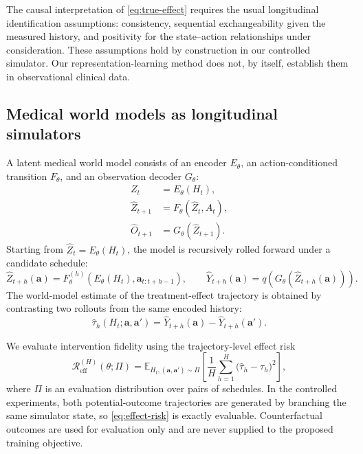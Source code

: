 The causal interpretation of \eqref{eq:true-effect} requires the usual
longitudinal identification assumptions: consistency, sequential
exchangeability given the measured history, and positivity for the
state--action relationships under consideration. These assumptions hold
by construction in our controlled simulator. Our representation-learning
method does not, by itself, establish them in observational clinical data.

\subsection{Medical world models as longitudinal simulators}

A latent medical world model consists of an encoder $E_\theta$, an
action-conditioned transition $F_\theta$, and an observation decoder
$G_\theta$:
\begin{align}
    Z_t &= E_\theta(H_t),
    \label{eq:encoder}\\
    \widehat Z_{t+1} &= F_\theta(\widehat Z_t,A_t),
    \label{eq:transition}\\
    \widehat O_{t+1} &= G_\theta(\widehat Z_{t+1}).
    \label{eq:decoder}
\end{align}
Starting from $\widehat Z_t=E_\theta(H_t)$, the model is recursively
rolled forward under a candidate schedule:
\begin{equation}
    \widehat Z_{t+h}(\bm a)
    =F_\theta^{(h)}
    \!\left(E_\theta(H_t),\bm a_{t:t+h-1}\right),
    \qquad
    \widehat Y_{t+h}(\bm a)
    =q\!\left(G_\theta(\widehat Z_{t+h}(\bm a))\right).
    \label{eq:model-rollout}
\end{equation}
The world-model estimate of the treatment-effect trajectory is obtained
by contrasting two rollouts from the same encoded history:
\begin{equation}
    \widehat\tau_h(H_t;\bm a,\bm a')
    =\widehat Y_{t+h}(\bm a)-\widehat Y_{t+h}(\bm a').
    \label{eq:model-effect}
\end{equation}

We evaluate intervention fidelity using the trajectory-level effect risk
\begin{equation}
    \mathcal R_{\mathrm{eff}}^{(H)}(\theta;\Pi)
    =
    \mathbb E_{H_t,(\bm a,\bm a')\sim\Pi}
    \left[
        \frac{1}{H}\sum_{h=1}^{H}
        \bigl(\widehat\tau_h-\tau_h\bigr)^2
    \right],
    \label{eq:effect-risk}
\end{equation}
where $\Pi$ is an evaluation distribution over pairs of schedules. In
the controlled experiments, both potential-outcome trajectories are
generated by branching the same simulator state, so
\eqref{eq:effect-risk} is exactly evaluable. Counterfactual outcomes are
used for evaluation only and are never supplied to the proposed training
objective.

